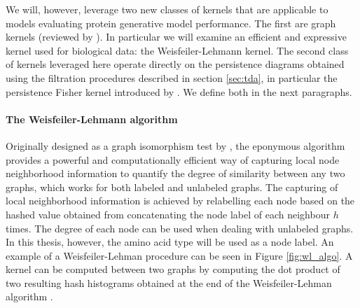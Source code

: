 We will, however, leverage two new classes of kernels that are applicable to
models evaluating protein generative model performance. The first are graph
kernels (reviewed by \cite{borgwardt2020graph}). In particular we will examine
an efficient and expressive kernel used for biological
data: the Weisfeiler-Lehmann kernel. The second class of kernels leveraged here
operate directly on the persistence diagrams obtained using the filtration
procedures described in section \ref{sec:tda}, in particular the
persistence Fisher kernel introduced by \cite{le2018persistence}. We define both
in the next paragraphs.

\paragraph{The Weisfeiler-Lehmann algorithm} Originally designed as a graph
isomorphism test by \cite{weisfeiler1968reduction}, the eponymous
algorithm provides a powerful and computationally efficient way of capturing
local node neighborhood information to quantify the degree of similarity between
any two graphs, which works for both labeled and unlabeled graphs. The capturing
of local neighborhood information is achieved by relabelling each node based on
the hashed value obtained from concatenating the node label of each neighbour
$h$ times. The degree of each node can be used when dealing with unlabeled
graphs. In this thesis, however, the amino acid type will be used as a node
label. An example of a Weisfeiler-Lehman procedure can be seen in Figure
\ref{fig:wl_algo}. A kernel can be computed between two graphs by computing the
dot product of two resulting hash histograms obtained at the end of the
Weisfeiler-Lehman algorithm \citep{shervashidze2011weisfeiler}.

